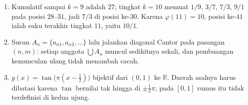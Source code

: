 \begin{enumerate}[label=\textbf{2.\arabic*}]
  \item Kumulatif sampai $k=9$ adalah $27$; tingkat $k=10$ memuat $1/9,\,3/7,\,7/3,\,
        9/1$ pada posisi $28$--$31$, jadi $7/3$ di posisi ke-$30$. Karena
        $\varphi(11)=10$, posisi ke-$41$ ialah suku terakhir tingkat $11$, yaitu
        $10/1$.

  \item Susun $A_{n}=\{a_{n1},a_{n2},\dots\}$ lalu jalankan diagonal Cantor pada
        pasangan $(n,m)$: setiap anggota $\bigcup A_{n}$ muncul sedikitnya sekali,
        dan pembuangan kemunculan ulang tidak menambah cacah.

  \item $g(x)=\tan\bigl(\pi(x-\tfrac12)\bigr)$ bijektif dari $(0,1)$ ke
        $\mathbb{R}$. Daerah asalnya harus dibatasi karena $\tan$ bernilai tak hingga
        di $\pm\tfrac12\pi$; pada $[0,1]$ rumus itu tidak terdefinisi di kedua ujung.
\end{enumerate}

